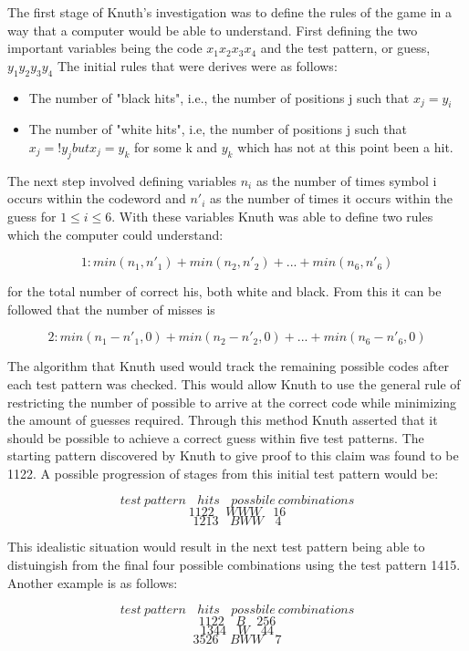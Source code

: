 \documentclass[12pt]{article}  %
\theoremstyle{definition}
\theoremstyle{remark}
\begin{document}
The first stage of Knuth's investigation was to define the rules of the game in a way that a computer would be able to understand. First defining the two important variables being the code $x_1 x_2 x_3 x_4$ and the test pattern, or guess, $y_1 y_2 y_3 y_4$ The initial rules that were derives were as follows:
\begin {itemize}
	\item {The number of "black hits", i.e., the number of positions j such that $x_j = y_i$}
	\item {The number of "white hits", i.e, the number of positions j such that $x_j =! y_j but x_j = y_k$ for some k and $y_k$ which has not at this point been a hit.} \cite {Knuth}
\end {itemize}

The next step involved defining variables $n_i$ as the number of times symbol i occurs within the codeword and $n'_i$ as the number of times it occurs within the guess for $1 \le i \le 6$. With these variables Knuth was able to define two rules which the computer could understand:

\[1:	 min(n_1, n'_1) + min(n_2, n'_2) + ... + min(n_6, n'_6) \]

for the total number of correct his, both white and black. From this it can be followed that the number of misses is

\[2:	 min(n_1- n'_1, 0) + min(n_2- n'_2, 0) + ... + min(n_6- n'_6, 0) \]

The algorithm that Knuth used would track the remaining possible codes after each test pattern was checked. This would allow Knuth to use the general rule of restricting the number of possible to arrive at the correct code while minimizing the amount of guesses required. Through this method Knuth asserted that it should be possible to achieve a correct guess within five test patterns. The starting pattern discovered by Knuth to give proof to this claim was found to be 1122. A possible progression of stages from this initial test pattern would be:

\[ test \ pattern \ \ \ \  hits \ \ \ \  possbile \ combinations \]
\[ 1122 \ \ \ \ WWW \ \ \ \  16 \]
\[ 1213 \ \ \ \ BWW \ \ \ \  4 \]

This idealistic situation would result in the next test pattern being able to distuingish from the final four possible combinations using the test pattern 1415.
Another example is as follows:

\[ test \ pattern \ \ \ \  hits \ \ \ \  possbile \ combinations \]
\[ 1122 \ \ \ \ B \ \ \ \  256 \]
\[ 1344 \ \ \ \ W \ \ \ \  44 \]
\[ 3526 \ \ \ \ BWW \ \ \ \  7 \]
\end{document}
